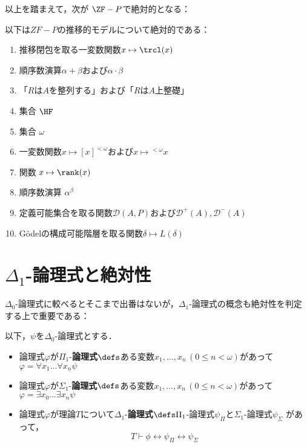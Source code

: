 \documentclass[a4j]{ltjsarticle}
\begin{document}
以上を踏まえて，次が $\ZF-P$で絶対的となる：

\begin{theorem}[$ZF-P$で絶対的]
 以下は$ZF-P$の推移的モデルについて絶対的である：
 \begin{enumerate}
  \item 推移閉包を取る一変数関数$x \mapsto \trcl(x)$
  \item 順序数演算$\alpha + \beta$および$\alpha \cdot \beta$
  \item 「$R$は$A$を整列する」および「$R$は$A$上整礎」
  \item 集合 $\HF$
  \item 集合 $\omega$
  \item 一変数関数$x \mapsto [x]^{<\omega}$および$x \mapsto {}^{<\omega} x$
  \item 関数 $x \mapsto \rank(x)$
  \item 順序数演算 $\alpha^\beta$
  \item 定義可能集合を取る関数$\mathcal{D}(A, P)$および$\mathcal{D}^+(A), \mathcal{D}^-(A)$
  \item G\"{o}delの構成可能階層を取る関数$\delta \mapsto L(\delta)$
 \end{enumerate}
\end{theorem}

\section{$\Delta_1$-論理式と絶対性}
$\Delta_0$-論理式に較べるとそこまで出番はないが，$\Delta_1$-論理式の概念も絶対性を判定する上で重要である：

\begin{definition}
 以下，$\psi$を$\Delta_0$-論理式とする．
 
 \begin{itemize}
  \item 論理式$\varphi$が$\Pi_1$-{\bfseries 論理式}$\defs$ある変数$x_1, \dots, x_n\,(0 \leq n < \omega)$があって$\varphi = \forall x_1 \dots \forall x_n \psi$
  \item 論理式$\varphi$が$\Sigma_1$-{\bfseries 論理式}$\defs$ある変数$x_1, \dots, x_n\,(0 \leq n < \omega)$があって$\varphi = \exists x_0 \dots \exists x_n \psi$
  \item 論理式$\varphi$が理論$T$について$\Delta_1$-{\bfseries 論理式}$\defs \Pi_1$-論理式$\psi_\Pi$と$\Sigma_1$-論理式$\psi_\Sigma$ があって，
	\[
	 T \vdash \phi \leftrightarrow \psi_\Pi \leftrightarrow \psi_\Sigma
	\]
 \end{itemize}
\end{definition}
\end{document}
